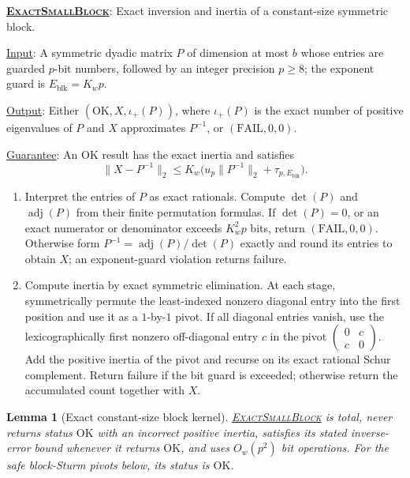 \documentclass[11pt]{article}
\newenvironment{fminipage}%
  {\begin{Sbox}\begin{minipage}}%
  {\end{minipage}\end{Sbox}\fbox{\TheSbox}}
\newenvironment{algbox}[0]{%
\vskip 0.2in
\noindent
\begin{fminipage}{6.3in}
}{%
\end{fminipage}
\vskip 0.2in
}
\newtheorem{lemma}{Lemma}[section]
\newcommand{\ExactSmallBlock}{%
  \textnormal{\textsc{Exact\hspace{0pt}Small\hspace{0pt}Block}}}
\begin{document}
\begin{algbox}
\textbf{\uline{\ExactSmallBlock}}: Exact inversion and inertia of a
constant-size symmetric block.
\label{alg:small-block}

\uline{Input}: A symmetric dyadic matrix $P$ of dimension at most $b$ whose
entries are guarded $p$-bit numbers, followed by an integer precision
$p\geq8$; the exponent guard is $E_{\mathrm{blk}}=K_wp$.

\uline{Output}: Either $(\mathrm{OK},X,\iota_+(P))$, where $\iota_+(P)$ is
the exact number of positive eigenvalues of $P$ and $X$ approximates
$P^{-1}$, or $(\mathrm{FAIL},0,0)$.

\uline{Guarantee}: An $\mathrm{OK}$ result has the exact inertia and satisfies
\[
 \lVert X-P^{-1}\rVert_2\leq
 K_w\bigl(u_p\lVert P^{-1}\rVert_2+\tau_{p,E_{\mathrm{blk}}}\bigr).
\]

\begin{enumerate}
 \item Interpret the entries of $P$ as exact rationals.  Compute $\det(P)$
 and $\operatorname{adj}(P)$ from their finite permutation formulas.  If
 $\det(P)=0$, or an exact numerator or denominator exceeds $K_w^2p$ bits,
 return $(\mathrm{FAIL},0,0)$.  Otherwise form
 $P^{-1}=\operatorname{adj}(P)/\det(P)$ exactly and round its entries to
 obtain $X$; an exponent-guard violation returns failure.
 \item Compute inertia by exact symmetric elimination.  At each stage,
 symmetrically permute the least-indexed nonzero diagonal entry into the first
 position and use it as a $1$-by-$1$ pivot.  If all diagonal entries vanish,
 use the lexicographically first nonzero off-diagonal entry $c$ in the pivot
 $\left(\begin{smallmatrix}0&c\\c&0\end{smallmatrix}\right)$.  Add the
 positive inertia of the pivot and recurse on its exact rational Schur
 complement.  Return failure if the bit guard is exceeded; otherwise return
 the accumulated count together with $X$.
\end{enumerate}
\end{algbox}

\begin{lemma}[Exact constant-size block kernel]
\label{lem:small-block-kernel}
\hyperref[alg:small-block]{\ExactSmallBlock} is total, never returns
status $\mathrm{OK}$ with an incorrect positive inertia, satisfies its stated inverse-error bound
whenever it returns $\mathrm{OK}$, and uses $O_w(p^2)$ bit operations.
For the safe block-Sturm pivots below, its status is $\mathrm{OK}$.
\end{lemma}
\end{document}
